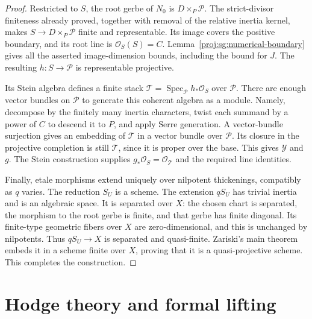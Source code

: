 \documentclass[11pt,letterpaper]{article}
\newcommand{\OO}{\mathcal{O}}
\DeclareMathOperator{\Spec}{Spec}
\theoremstyle{definition}
\theoremstyle{remark}
\begin{document}
\begin{proof}
Restricted to $S$, the root gerbe of $N_0$ is
$D\times_P\mathcal P$.  The strict-divisor finiteness already
proved, together with removal of the relative inertia kernel,
makes $S\to D\times_P\mathcal P$ finite and representable.
Its image covers the positive boundary, and its root line is
$\OO_S(S)=C$.  Lemma~\ref{proj:sg:numerical-boundary} gives all the
asserted image-dimension bounds, including the bound for $J$.
The resulting $h:S\to\mathcal P$ is representable projective.

Its Stein algebra defines a finite stack
$\mathcal T=\Spec_{\mathcal P}h_*\OO_S$ over $\mathcal P$.
There are enough vector bundles on $\mathcal P$ to generate
this coherent algebra as a module.  Namely, decompose by the
finitely many inertia characters, twist each summand by a
power of $C$ to descend it to $P$, and apply Serre generation.
A vector-bundle surjection gives an embedding of $\mathcal T$
in a vector bundle over $\mathcal P$.  Its closure in the
projective completion is still $\mathcal T$, since it is
proper over the base.  This gives $\mathcal Y$ and $g$.
The Stein construction supplies $g_*\OO_S=\OO_{\mathcal T}$
and the required line identities.

Finally, etale morphisms extend uniquely over nilpotent
thickenings, compatibly as $q$ varies.  The reduction $S_U$
is a scheme.  The extension $qS_U$ has trivial inertia and
is an algebraic space.  It is separated over $X$: the chosen
chart is separated, the morphism to the root gerbe is finite,
and that gerbe has finite diagonal.  Its finite-type
geometric fibers over $X$ are zero-dimensional, and this is
unchanged by nilpotents.  Thus $qS_U\to X$ is separated and
quasi-finite.  Zariski's main theorem embeds it in a scheme
finite over $X$, proving that it is a quasi-projective
scheme.  This completes the construction.
\end{proof}

\section{Hodge theory and formal lifting}\label{proj:sec:hodge}
\end{document}
